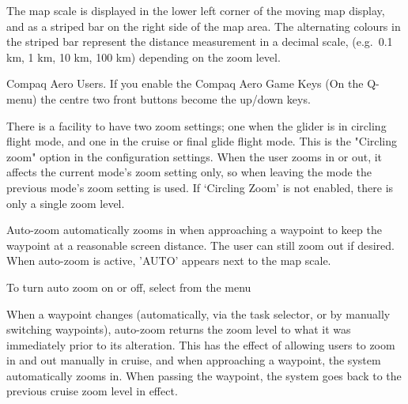 \documentclass[a4paper,12pt]{refrep}
\begin{document}
The map scale is displayed in the lower left corner of the moving map
display, and as a striped bar on the right side of the map area.  The
alternating colours in the striped bar represent the distance
measurement in a decimal scale, (e.g.\ 0.1 km, 1 km, 10 km, 100 km)
depending on the zoom level.

Compaq Aero Users. If you enable the Compaq Aero Game Keys (On the
Q-menu) the centre two front buttons become the up/down keys.

There is a facility to have two zoom settings; one when the glider is
in circling flight mode, and one in the cruise or final glide flight
mode.  This is the "Circling zoom" option in the configuration
settings.  
When the user zooms in or out, it affects the current
mode's zoom setting only, so when leaving the mode the previous mode's
zoom setting is used.  If `Circling Zoom' is not enabled, there is
only a single zoom level.

Auto-zoom automatically zooms in when approaching a waypoint to keep
the waypoint at a reasonable screen distance.  The user can still zoom
out if desired.  When auto-zoom is active, 'AUTO' appears next to the
map scale.  

To turn auto zoom on or off, select from the menu
\begin{quote}
\blink{} 
\end{quote}

When a waypoint changes (automatically, via the task selector, or by
manually switching waypoints), auto-zoom returns the zoom level to what
it was immediately prior to its alteration.  This has the effect of
allowing users to zoom in and out manually in cruise, and when
approaching a waypoint, the system automatically zooms in.  When
passing the waypoint, the system goes back to the previous cruise zoom
level in effect.
\end{document}
